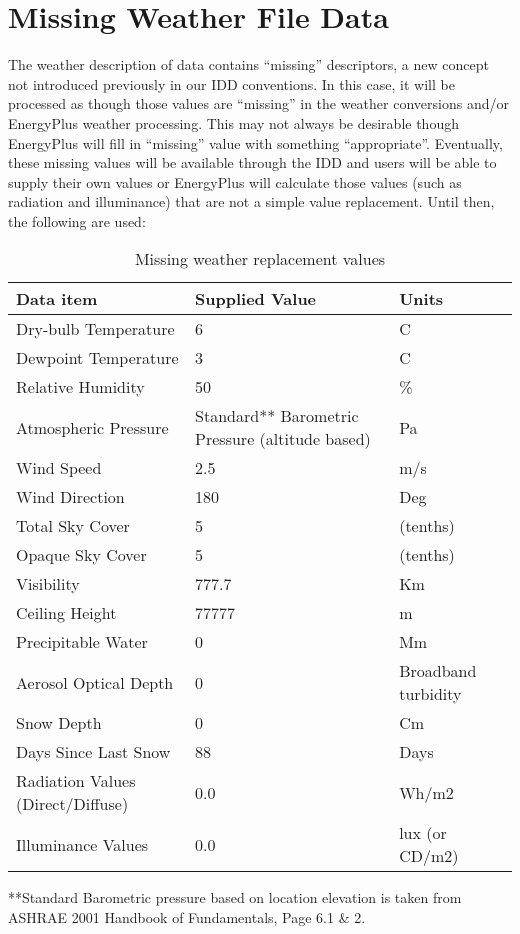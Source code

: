 \section{Missing Weather File Data}\label{missing-weather-file-data}

The weather description of data contains ``missing'' descriptors, a new concept not introduced previously in our IDD conventions. In this case, it will be processed as though those values are ``missing'' in the weather conversions and/or EnergyPlus weather processing. This may not always be desirable though EnergyPlus will fill in ``missing'' value with something ``appropriate''. Eventually, these missing values will be available through the IDD and users will be able to supply their own values or EnergyPlus will calculate those values (such as radiation and illuminance) that are not a simple value replacement. Until then, the following are used:

\begin{longtable}[c]{p{1.83in}p{2.67in}p{1.5in}}
\caption{Missing weather replacement values \protect \label{table:missing-weather-replacement-values}}\\
\toprule 
Data item & Supplied Value & Units \tabularnewline \midrule
\endhead
Dry-bulb Temperature & 6 & C \tabularnewline
Dewpoint Temperature & 3 & C \tabularnewline
Relative Humidity & 50 & \% \tabularnewline
Atmospheric Pressure & Standard** Barometric Pressure (altitude based) & Pa \tabularnewline
Wind Speed & 2.5 & m/s \tabularnewline
Wind Direction & 180 & Deg \tabularnewline
Total Sky Cover & 5 & (tenths) \tabularnewline
Opaque Sky Cover & 5 & (tenths) \tabularnewline
Visibility & 777.7 & Km \tabularnewline
Ceiling Height & 77777 & m \tabularnewline
Precipitable Water & 0 & Mm \tabularnewline
Aerosol Optical Depth & 0 & Broadband turbidity \tabularnewline
Snow Depth & 0 & Cm \tabularnewline
Days Since Last Snow & 88 & Days \tabularnewline
Radiation Values (Direct/Diffuse) & 0.0 & Wh/m2 \tabularnewline
Illuminance Values & 0.0 & lux (or CD/m2) \tabularnewline
\bottomrule
\end{longtable}

**Standard Barometric pressure based on location elevation is taken from ASHRAE 2001 Handbook of Fundamentals, Page 6.1 \& 2.

